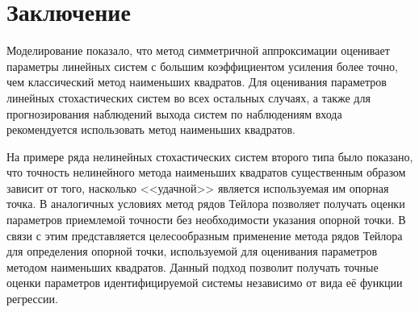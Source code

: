 \section{Заключение}

Моделирование показало, что метод симметричной аппроксимации оценивает
параметры линейных систем с большим коэффициентом усиления более точно,
чем классический метод наименьших квадратов.
Для оценивания параметров линейных стохастических систем во всех остальных случаях,
а также для прогнозирования наблюдений выхода систем по наблюдениям входа
рекомендуется использовать метод наименьших квадратов.

На примере ряда нелинейных стохастических систем второго типа было показано,
что точность нелинейного метода наименьших квадратов существенным образом
зависит от того, насколько <<удачной>> является используемая им опорная точка.
В аналогичных условиях метод рядов Тейлора позволяет получать оценки параметров
приемлемой точности без необходимости указания опорной точки.
В связи с этим представляется целесообразным применение метода рядов Тейлора
для определения опорной точки, используемой для оценивания параметров методом
наименьших квадратов.
Данный подход позволит получать точные оценки параметров идентифицируемой системы
независимо от вида её функции регрессии.

